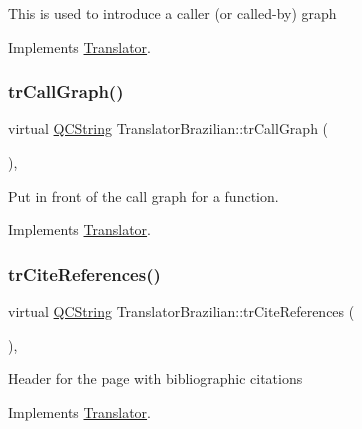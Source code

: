 This is used to introduce a caller (or called-\/by) graph 

Implements \mbox{\hyperlink{class_translator}{Translator}}.

\mbox{\label{class_translator_brazilian_a57c9e5abeef5c9c8d2f00b022cb76d8f}} 
\subsubsection{\texorpdfstring{trCallGraph()}{trCallGraph()}}
{\footnotesize\ttfamily virtual \mbox{\hyperlink{class_q_c_string}{Q\+C\+String}} Translator\+Brazilian\+::tr\+Call\+Graph (\begin{DoxyParamCaption}{ }\end{DoxyParamCaption})\hspace{0.3cm}{\ttfamily [inline]}, {\ttfamily [virtual]}}

Put in front of the call graph for a function. 

Implements \mbox{\hyperlink{class_translator}{Translator}}.

\mbox{\label{class_translator_brazilian_aaf87bc9ae2d83119a95c715c2dcff8bc}} 
\subsubsection{\texorpdfstring{trCiteReferences()}{trCiteReferences()}}
{\footnotesize\ttfamily virtual \mbox{\hyperlink{class_q_c_string}{Q\+C\+String}} Translator\+Brazilian\+::tr\+Cite\+References (\begin{DoxyParamCaption}{ }\end{DoxyParamCaption})\hspace{0.3cm}{\ttfamily [inline]}, {\ttfamily [virtual]}}

Header for the page with bibliographic citations 

Implements \mbox{\hyperlink{class_translator}{Translator}}.

\mbox{\label{class_translator_brazilian_a8a4f766cbbe98dbd0f67ff52bdd4da6c}} 
